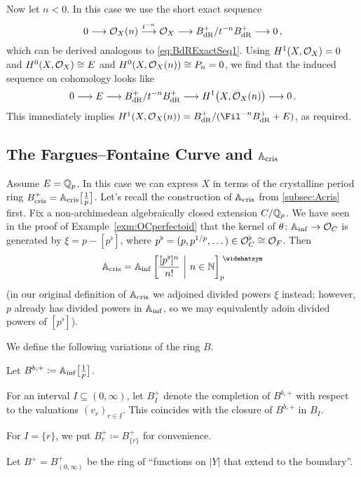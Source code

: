 \begin{proof*}
	Now let $n<0$. In this case we use the short exact sequence
	\begin{equation}\label{eq:BdRExactSeq3}
		0\morphism \Oo_X(n)\morphism[t^{-n}]\Oo_X\morphism B_\dR^+/t^{-n}B_\dR^+\morphism 0\,,
	\end{equation}
	which can be derived analogous to \cref{eq:BdRExactSeq1}. Using $H^1(X,\mathcal{O}_X)=0$ and $H^0(X,\mathcal{O}_X)\cong E$ and $H^0(X,\mathcal{O}_X(n))\cong P_n=0$, we find that the induced sequence on cohomology looks like
	\begin{equation*}
		0\morphism E\morphism B_\dR^+/t^{-n}B_\dR^+\morphism H^1\big(X,\Oo_X(n)\big)\morphism 0\,.
	\end{equation*}
	This immediately implies $H^1(X,\Oo_X(n))=B_\dR^+/(\Fil^{-n}B_\dR^++E)$, as required.
\end{proof*}
\subsection{The Fargues--Fontaine Curve and \texorpdfstring{$\mathbb{A}_{\mathrm{cris}}$}{Acris}}
Assume $E=\mathbb{Q}_p$. In this case we can express $X$ in terms of the crystalline period ring $B_{\mathrm{cris}}^+=\mathbb{A}_{\mathrm{cris}}\big[\textstyle\frac{1}{p}\big]$. Let's recall the construction of $\mathbb{A}_{\mathrm{cris}}$ from \cref{subsec:Acris} first. Fix a non-archimedean algebraically closed extension $C/\mathbb{Q}_p$. We have seen in the proof of Example~\cref{exm:OCperfectoid} that the kernel of $\theta\colon\IA_\inf\morphism \Oo_C$ is generated by $\xi=p-[p^\flat]$, where $p^\flat=(p,p^{1/p},\dotsc)\in \mathcal{O}_C^\flat\cong \mathcal{O}_F$. Then
\begin{equation*}
	\IA_\cris=\IA_\inf\left[\frac{[p^\flat]^n}{n!}\st n\in\IN\right]_p^\complete
\end{equation*}
(in our original definition of $\mathbb{A}_{\mathrm{cris}}$ we adjoined divided powers $\xi$ instead; however, $p$ already has divided powers in $\mathbb{A}_{\mathrm{inf}}$, so we may equivalently adoin divided powers of $[p^\flat]$).
\begin{defi}\label{def:Bb+}
	We define the following variations of the ring $B$.
	\begin{numerate}
		\item Let $B^{b,+}\coloneqq \mathbb{A}_{\mathrm{inf}}\big[\textstyle\frac{1}{p}\big]$.
		\item For an interval $I\subseteq (0,\infty)$, let $B_I^+$ denote the completion of $B^{b,+}$ with respect to the valuations $(v_r)_{r\in I}$. This coincides with the closure of $B^{b,+}$ in $B_I$.
		\item For $I=\{r\}$, we put $B_r^+\coloneqq B_{\{r\}}^+$ for convenience.
		\item Let $B^+=B_{(0,\infty)}^+$ be the ring of \enquote{functions on $|Y|$ that extend to the boundary}.
	\end{numerate}
\end{defi}
